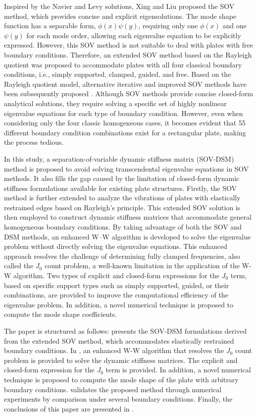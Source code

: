 \documentclass[preprint,12pt,number]{elsarticle}
\begin{document}
Inspired by the Navier and Levy solutions, Xing and Liu \cite{xing2009new} proposed the SOV method, which provides concise and explicit eigensolutions.
The mode shape function has a separable form, $\phi(x) \psi(y)$, requiring only one $\phi(x)$ and one $\psi(y)$ for each mode order, allowing each eigenvalue equation to be explicitly expressed.
However, this SOV method is not suitable to deal with plates with free boundary conditions.
Therefore, an extended SOV method \cite{xing2018overall, xing2020extended} based on the Rayleigh quotient was proposed to accommodate plates with all four classical boundary conditions, i.e., simply supported, clamped, guided, and free.
Based on the Rayleigh quotient model, alternative iterative and improved SOV methods have been subsequently proposed \cite{xing2020improved}.
Although SOV methods provide concise closed-form analytical solutions, they require solving a specific set of highly nonlinear eigenvalue equations for each type of boundary condition.
However, even when considering only the four classic homogeneous cases, it becomes evident that 55 different boundary condition combinations exist for a rectangular plate, making the process tedious.

In this study, a separation-of-variable dynamic stiffness matrix (SOV-DSM) method is proposed to avoid solving transcendental eigenvalue equations in SOV methods.
It also fills the gap caused by the limitation of closed-form dynamic stiffness formulations available for existing plate structures.
Firstly, the SOV method is further extended to analyze the vibrations of plates with elastically restrained edges based on Rayleigh’s principle. 
This extended SOV solution is then employed to construct dynamic stiffness matrices that accommodate general homogeneous boundary conditions.
By taking advantage of both the SOV and DSM methods, an enhanced W–W algorithm is developed to solve the eigenvalue problem without directly solving the eigenvalue equations.
This enhanced approach resolves the challenge of determining fully clamped frequencies, also called the $J_0$ count problem, a well-known limitation in the application of the W-W algorithm. 
Two types of explicit and closed-form expressions for the $J_0$ term, based on specific support types such as simply supported, guided, or their combinations, are provided to improve the computational efficiency of the eigenvalue problem.
In addition, a novel numerical technique is proposed to compute the mode shape coefficients. 

The paper is structured as follows:  presents the SOV-DSM formulations derived from the extended SOV method, which accommodates elastically restrained boundary conditions.
In , an enhanced W-W algorithm that resolves the $J_0$ count problem is provided to solve the dynamic stiffness matrices. 
The explicit and closed-form expression for the $J_0$ term is provided. 
In addition, a novel numerical technique is proposed to compute the mode shape of the plate with arbitrary boundary conditions.
 validates the proposed method through numerical experiments by comparison under several boundary conditions.
Finally, the conclusions of this paper are presented in .
\end{document}

